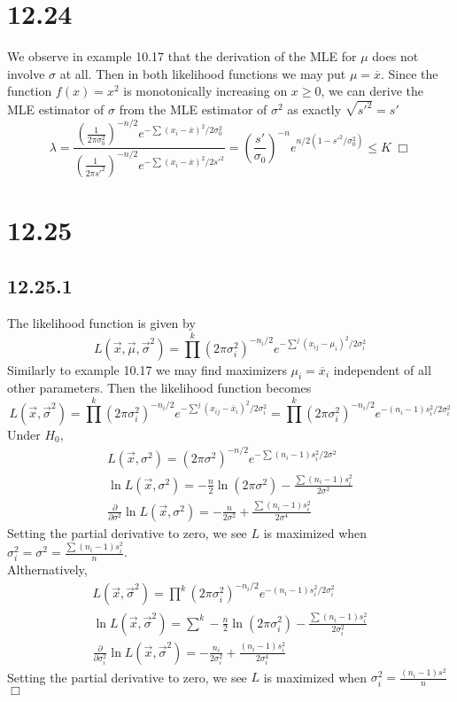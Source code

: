 \documentclass{article}
\begin{document}
\section*{12.24}
We observe in example 10.17 that the derivation of the MLE for $\mu$ does not involve $\sigma$ at all. Then in both likelihood functions we may put $\mu = \overline{x}$. Since the function $f(x) = x^2$ is monotonically increasing on $x \geqslant 0$, we can derive the MLE estimator of $\sigma$ from the MLE estimator of $\sigma^2$ as exactly $\sqrt{{s'}^2} = s'$
$$\lambda = \frac{\left(\frac{1}{2\pi\sigma_0^2}\right)^{-n/2}e^{-\sum(x_i-\overline{x})^2/2\sigma_0^2}}{\left(\frac{1}{2\pi{s'}^2}\right)^{-n/2}e^{-\sum(x_i-\overline{x})^2/2{s'}^2}} = \left(\frac{s'}{\sigma_0}\right)^{-n} e^{n/2(1 - {s'}^2/\sigma_0^2)} \leqslant K \;\Box$$

\section*{12.25}
\subsection*{12.25.1}
The likelihood function is given by
$$L(\vec{x}, \vec{\mu}, \vec{\sigma}^2) = \prod\limits^k (2\pi\sigma_i^2)^{-n_i/2} e^{-\sum\limits^j(x_{ij}-\mu_i)^2/2\sigma_i^2}$$
Similarly to example 10.17 we may find maximizers $\mu_i = \overline{x}_i$ independent of all other parameters. Then the likelihood function becomes
$$L(\vec{x},\vec{\sigma}^2) = \prod\limits^k (2\pi\sigma_i^2)^{-n_i/2} e^{-\sum\limits^j(x_{ij}-\overline{x}_i)^2/2\sigma_i^2} = \prod\limits^k (2\pi\sigma_i^2)^{-n_i/2} e^{-(n_i-1)s_i^2/2\sigma_i^2}$$
Under $H_0$,
\begin{gather*}
L(\vec{x},\sigma^2) =(2\pi\sigma^2)^{-n/2} e^{-\sum(n_i-1)s_i^2 /2\sigma^2}\\
\ln L(\vec{x},\sigma^2) = -\frac{n}{2}\ln(2\pi\sigma^2)-\frac{\sum(n_i-1)s_i^2}{2\sigma^2}\\
\frac{\partial}{\partial\sigma^2}\ln L(\vec{x},\sigma^2) = -\frac{n}{2\sigma^2}+\frac{\sum(n_i-1)s_i^2}{2\sigma^4}
\end{gather*}
Setting the partial derivative to zero, we see $L$ is maximized when $\sigma^2_i = \sigma^2 = \frac{\sum(n_i-1)s_i^2}{n}$.\\
Althernatively,
\begin{gather*}
L(\vec{x},\vec{\sigma}^2) = \prod\limits^k (2\pi\sigma_i^2)^{-n_i/2} e^{-(n_i-1)s_i^2/2\sigma_i^2}\\
\ln L(\vec{x},\vec{\sigma}^2) = \sum\limits^k -\frac{n}{2}\ln(2\pi\sigma_i^2)-\frac{\sum(n_i-1)s_i^2}{2\sigma_i^2}\\
\frac{\partial}{\partial\sigma_i^2}\ln L(\vec{x},\vec{\sigma}^2) = -\frac{n_i}{2\sigma_i^2} + \frac{(n_i-1)s_i^2}{2\sigma_i^4}
\end{gather*}
Setting the partial derivative to zero, we see $L$ is maximized when $\sigma_i^2 = \frac{(n_i-1)s^2}{n}$ $\Box$
\end{document}
